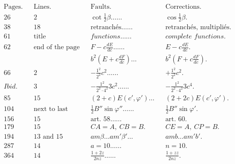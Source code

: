 \documentclass{article}
\begin{document}
\[
\begin{aligned}
&\text{Pages.} && \text{Lines.} && \text{Faults.} && \text{Corrections.}\\
&26 && 2 && \cot\tfrac{1}{2}\beta\ldots\ldots && \cos\tfrac{1}{2}\beta.\\
&38 && 18 && \text{retranchés}\ldots\ldots && \text{retranchés, multipliés.}\\
&61 && \text{title} && \textit{functions}\ldots\ldots && \textit{complete functions.}\\
&62 && \text{end of the page} && F-c\frac{dE}{dc}\ldots\ldots && E-c\frac{dE}{dc}.\\
& && && b^{2}\left(E+c\frac{dF}{dc}\right)\ldots && b^{2}\left(F+c\frac{dF}{dc}\right).\\
&66 && 2 && -\frac{1^{2}}{2^{2}}c^{2}\ldots\ldots && +\frac{1^{2}}{2^{2}}c^{2}.\\
&\textit{Ibid.} && 3 && -\frac{1^{2}}{2^{2}\cdot4^{2}}3c^{2}\ldots\ldots && -\frac{1^{2}}{2^{2}\cdot4^{2}}3c^{4}.\\
&85 && 15 && (2+c)E(c',\varphi')\ldots && (2+2c)E(c',\varphi').\\
&104 && \text{next to last} && \tfrac{1}{2}B''\sin\varphi''\ldots\ldots && \tfrac{1}{2}B''\sin\varphi'.\\
&156 && 15 && \text{art.\ 58}\ldots\ldots && \text{art.\ 60.}\\
&179 && 15 && CA=A,\ CB=B. && CE=A,\ CP=B.\\
&194 && \text{13 and 15} && am\beta\ldots am'\beta'\ldots && amb\ldots am'b'.\\
&287 && 14 && a=10\ldots\ldots && n=10.\\
&364 && 14 && \frac{1+2z}{2nz}\ldots\ldots && \frac{1+zz}{2nz}.
\end{aligned}
\]
\end{document}
